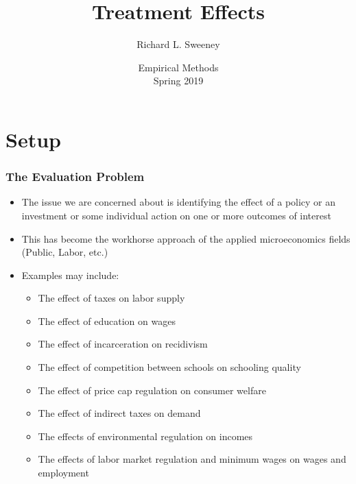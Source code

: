 

\title{Treatment Effects}
\author{Richard L. Sweeney}
\date{Empirical Methods \\ Spring 2019}




\begin{frame}
    \titlepage
\end{frame}

\begin{frame}
    \tableofcontents  
\end{frame}


\section{Setup}

\begin{frame}
\frametitle{The Evaluation Problem}
\begin{itemize}
\item The issue we are concerned about is identifying the effect of a policy or an investment or some individual action on one or more outcomes of interest
\item This has become the workhorse approach of the applied microeconomics fields (Public, Labor, etc.)
\item Examples may include:
\begin{itemize}
\item The effect of taxes on labor supply
\item The effect of education on wages
\item The effect of incarceration on recidivism
\item The effect of competition between schools on schooling quality
\item The effect of price cap regulation on consumer welfare
\item The effect of indirect taxes on demand
\item The effects of environmental regulation on incomes
\item The effects of labor market regulation and minimum wages on wages and employment
\end{itemize}
\end{itemize}
\end{frame}

